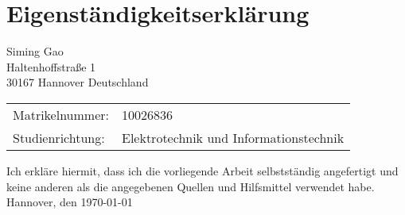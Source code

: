 \chapter*{Eigenständigkeitserklärung}
\thispagestyle{empty}
\vspace{1cm}

\begin{flushleft}

Siming Gao \\ 
Haltenhoffstraße 1 \\ 
30167 Hannover Deutschland

\vspace{1.0cm}

\begin{tabular}{@{} l l}
Matrikelnummer:  & 10026836 \\
Studienrichtung: & Elektrotechnik und Informationstechnik \\
\end{tabular}

\vspace{3.0cm}

Ich erkläre hiermit, dass ich die vorliegende Arbeit selbstständig
angefertigt und keine anderen als die angegebenen Quellen und
Hilfsmittel verwendet habe. \\ [2cm]

Hannover, den \today

\end{flushleft}
